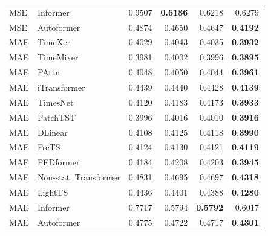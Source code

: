 \begin{longtable}{llrrrr}
MSE & Informer & 0.9507 & \textbf{0.6186} & 0.6218 & 0.6279 \\
MSE & Autoformer & 0.4874 & 0.4650 & 0.4647 & \textbf{0.4192} \\
\midrule
MAE & TimeXer & 0.4029 & 0.4043 & 0.4035 & \textbf{0.3932} \\
MAE & TimeMixer & 0.3981 & 0.4002 & 0.3996 & \textbf{0.3895} \\
MAE & PAttn & 0.4048 & 0.4050 & 0.4044 & \textbf{0.3961} \\
MAE & iTransformer & 0.4439 & 0.4440 & 0.4428 & \textbf{0.4139} \\
MAE & TimesNet & 0.4120 & 0.4183 & 0.4173 & \textbf{0.3933} \\
MAE & PatchTST & 0.3996 & 0.4016 & 0.4010 & \textbf{0.3916} \\
MAE & DLinear & 0.4108 & 0.4125 & 0.4118 & \textbf{0.3990} \\
MAE & FreTS & 0.4124 & 0.4130 & 0.4121 & \textbf{0.4119} \\
MAE & FEDformer & 0.4184 & 0.4208 & 0.4203 & \textbf{0.3945} \\
MAE & Non-stat. Transformer & 0.4831 & 0.4695 & 0.4697 & \textbf{0.4318} \\
MAE & LightTS & 0.4436 & 0.4401 & 0.4388 & \textbf{0.4280} \\
MAE & Informer & 0.7717 & 0.5794 & \textbf{0.5792} & 0.6017 \\
MAE & Autoformer & 0.4775 & 0.4722 & 0.4717 & \textbf{0.4301} \\
\end{longtable}
\endgroup

